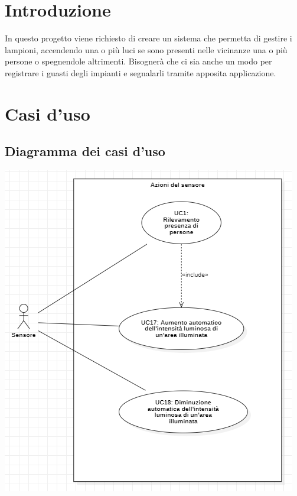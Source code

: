 \documentclass[a4paper, 12pt]{article}
\begin{document}
\makeindexdetails
\makefrontpage \makeversioni
\tableofcontents
\newpage
\clearpage
{} 

\section{Introduzione}
In questo progetto viene richiesto di creare un sistema che permetta di gestire i lampioni, accendendo una o più luci se sono presenti nelle vicinanze una o più persone o spegnendole altrimenti.\newline
Bisognerà che ci sia anche un modo per registrare i guasti degli impianti e segnalarli tramite apposita applicazione.\newline

\newpage

\section{Casi d'uso}

\subsection{Diagramma dei casi d'uso}

\includegraphics[scale=0.7]{diagramma_use_case_1.png}
\end{document}
